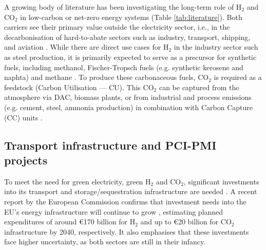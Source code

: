 \documentclass[pdflatex,sn-nature]{sn-jnl}
\theoremstyle{thmstyleone}%
\theoremstyle{thmstyletwo}%
\theoremstyle{thmstylethree}%
\begin{document}
A growing body of literature has been investigating the long-term role of H$_2$ and CO$_2$ in low-carbon or net-zero energy systems (Table \ref{tab:literature}). Both carriers see their primary value outside the electricity sector, i.e., in the decarbonisation of hard-to-abate sectors such as industry, transport, shipping, and aviation \cite{reigstadMovingLowcarbonHydrogen2022,vangreevenbroekLittleLoseCase2025}. While there are direct use cases for H$_2$ in the industry sector such as steel production, it is primarily expected to serve as a precursor for synthetic fuels, including methanol, Fischer-Tropsch fuels (e.g. synthetic kerosene and naphta) and methane \cite{neumannNearoptimalFeasibleSpace2021,neumannPotentialRoleHydrogen2023,neumannGreenEnergySteel2025,kountourisUnifiedEuropeanHydrogen2024,beresWillHydrogenSynthetic2024,fleiterHydrogenInfrastructureFuture2025}. To produce these carbonaceous fuels, CO$_2$ is required as a feedstock (Carbon Utilisation --- CU). This CO$_2$ can be captured from the atmosphere via DAC, biomass plants, or from industrial and process emissions (e.g. cement, steel, ammonia production) in combination with Carbon Capture (CC) units \cite{hofmannH2CO2Network2025,bakkenLinearModelsOptimization2008}.

\subsection{Transport infrastructure and PCI-PMI projects}
To meet the need for green electricity, green H$_2$ and CO$_2$, significant investments into its transport and storage/sequestration infrastructure are needed \cite{kountourisUnifiedEuropeanHydrogen2024,neumannPotentialRoleHydrogen2023,cerniauskasOptionsNaturalGas2020}. A recent report by the European Commission confirms that investment needs into the EU's energy infrastructure will continue to grow \cite{europeancommission.directorategeneralforenergy.InvestmentNeedsEuropean2025}, estimating planned expenditures of around €170 billion for H$_2$ and up to €20 billion for CO$_2$ infrastructure by 2040, respectively. It also emphasises that these investments face higher uncertainty, as both sectors are still in their infancy. 
\end{document}
